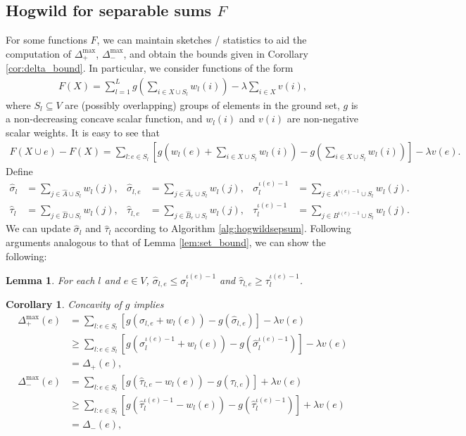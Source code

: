 \documentclass{article} %
\newtheorem{cor}[thm]{Corollary}
\newtheorem{lem}[thm]{Lemma}
\begin{document}
\subsection{Hogwild for separable sums $F$}
For some functions $F$, we can maintain sketches / statistics to aid the computation of $\Delta_+^{\max}$, $\Delta_-^{\max}$, and obtain the bounds given in Corollary \ref{cor:delta_bound}.
In particular, we consider functions of the form
\begin{align*}
F(X) = \sum_{l=1}^L g\left(\sum_{i\in X\cup S_l} w_l(i)\right) - \lambda\sum_{i\in X} v(i),
\end{align*}
where $S_l \subseteq V$ are (possibly overlapping) groups of elements in the ground set, $g$ is a non-decreasing concave scalar function, and $w_l(i)$ and $v(i)$ are non-negative scalar weights.
It is easy to see that
\begin{align*}
F(X \cup e) - F(X) = \sum_{l: e\in S_l} \left[g\left(w_l(e) + \sum_{i\in X\cup S_l} w_l(i)\right) - g\left(\sum_{i\in X\cup S_l} w_l(i)\right)\right] - \lambda v(e).
\end{align*}
Define
\begin{align*}
  \hat\sigma_l              &= \sum_{j\in \hat{A}\cup S_l} w_l(j),
& \hat\sigma_{l,e}          &= \sum_{j\in \hat{A}_e\cup S_l} w_l(j),
& \sigma_l^{\iota(e)-1} &= \sum_{j\in A^{\iota(e)-1}\cup S_l} w_l(j).\\
  \hat\tau_l              &= \sum_{j\in \hat{B}\cup S_l} w_l(j),
& \hat\tau_{l,e}          &= \sum_{j\in \hat{B}_e\cup S_l} w_l(j),
& \tau_l^{\iota(e)-1} &= \sum_{j\in B^{\iota(e)-1}\cup S_l} w_l(j).
\end{align*}
We can update $\hat\sigma_l$ and $\hat\tau_l$ according to Algorithm \ref{alg:hogwildsepsum}.
Following arguments analogous to that of Lemma \ref{lem:set_bound}, we can show the following:

\begin{lem} For each $l$ and $e\in V$, $\hat\sigma_{l,e} \leq \sigma_l^{\iota(e)-1}$ and $\hat\tau_{l,e} \geq \tau_l^{\iota(e)-1}$.
\end{lem}

\begin{cor} Concavity of $g$ implies
\begin{align*}
\Delta_+^{\max}(e)
&= \sum_{l:e\in S_l} \left[g(\hat\sigma_{l,e} + w_l(e)) - g(\hat\sigma_{l,e})\right] - \lambda v(e)\\
&\geq \sum_{l:e\in S_l} \left[g(\hat\sigma_l^{\iota(e)-1} + w_l(e)) - g(\hat\sigma_l^{\iota(e)-1})\right] - \lambda v(e)\\
&= \Delta_+(e),\\
\Delta_-^{\max}(e)
&= \sum_{l:e\in S_l} \left[g(\hat\tau_{l,e} - w_l(e)) - g(\hat\tau_{l,e})\right] + \lambda v(e)\\
&\geq \sum_{l:e\in S_l} \left[g(\hat\tau_l^{\iota(e)-1} - w_l(e)) - g(\hat\tau_l^{\iota(e)-1})\right] + \lambda v(e)\\
&= \Delta_-(e),
\end{align*}
\end{cor}
\end{document}
